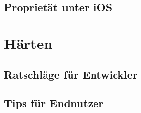\documentclass[aspectratio=169]{beamer}
\begin{document}
	\subsection{Proprietät unter iOS}
		
		
		
		
		
		
		
		
		
		
		
		
	
\section{Härten}
	\subsection{Ratschläge für Entwickler}
		
		
	\subsection{Tips für Endnutzer}
		


\end{document}

